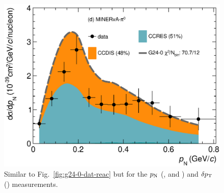 \begin{figure}
    \includegraphics[width=\dbfigwid\textwidth]{figures/0000-min_pi0_pn_reac_decomp.eps}
    \caption{\label{fig:g24-0-pn-reac} Similar to Fig.~\ref{fig:g24-0-dat-reac} but for the $p_\textrm{N}$ (\ttkpip, \minzpi and \minpiz) and $\delta p_\textrm{T}$ (\ttkzpi) measurements.
    } 
\end{figure}

